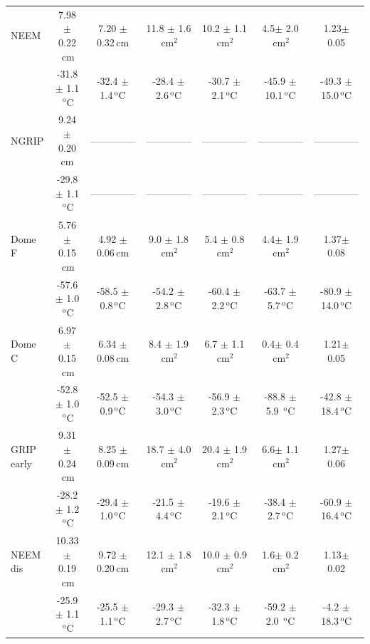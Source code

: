 \documentclass[11pt, draftcls, onecolumn]{IEEEtran} %
\numberwithin{equation}{section}
\numberwithin{table}{section}
\numberwithin{figure}{section}
\begin{document}
\begin{table}[]
\begin{tabular}{l c c c c c c}
		NEEM&7.98 $\pm$ 0.22$\,\mathrm{cm}$& 7.20 $\pm$ 0.32$\,\mathrm{cm}$& 11.8 $\pm$ 1.6$\,\mathrm{cm}^2$& 10.2 $\pm$ 1.1$\,\mathrm{cm}^2$& 4.5$\pm$ 2.0$\,\mathrm{cm}^2$& 1.23$\pm$ 0.05\\
		& -31.8 $\pm$ 1.1$\,^\mathrm{o}$C & -32.4 $\pm$ 1.4$\,^\mathrm{o}$C& -28.4 $\pm$ 2.6$\,^\mathrm{o}$C& -30.7 $\pm$ 2.1$\,^\mathrm{o}$C& -45.9 $\pm$ 10.1$\,^\mathrm{o}$C& -49.3 $\pm$ 15.0$\,^\mathrm{o}$C\\
		
		NGRIP &9.24 $\pm$ 0.20 $\mathrm{cm}$&-------------- &--------------&-------------- & --------------&-------------- \\
		& -29.8 $\pm$ 1.1$\,^\mathrm{o}$C &--------------& --------------& --------------& --------------&--------------\\	
	
		Dome F&5.76 $\pm$ 0.15$\,\mathrm{cm}$& 4.92 $\pm$ 0.06$\,\mathrm{cm}$& 9.0 $\pm$ 1.8$\,\mathrm{cm}^2$& 5.4 $\pm$ 0.8$\,\mathrm{cm}^2$& 4.4$\pm$ 1.9$\,\mathrm{cm}^2$& 1.37$\pm$ 0.08\\
		& -57.6 $\pm$ 1.0$\,^\mathrm{o}$C & -58.5 $\pm$ 0.8$\,^\mathrm{o}$C& -54.2 $\pm$ 2.8$\,^\mathrm{o}$C& -60.4 $\pm$ 2.2$\,^\mathrm{o}$C& -63.7 $\pm$ 5.7$\,^\mathrm{o}$C& -80.9 $\pm$ 14.0$\,^\mathrm{o}$C\\

		Dome C &6.97 $\pm$ 0.15$\,\mathrm{cm}$& 6.34 $\pm$ 0.08$\,\mathrm{cm}$& 8.4 $\pm$ 1.9$\,\mathrm{cm}^2$& 6.7 $\pm$ 1.1$\,\mathrm{cm}^2$& 0.4$\pm$ 0.4$\,\mathrm{cm}^2$& 1.21$\pm$ 0.05\\
		& -52.8 $\pm$ 1.0 $\,^\mathrm{o}$C & -52.5 $\pm$ 0.9$\,^\mathrm{o}$C& -54.3 $\pm$ 3.0$\,^\mathrm{o}$C& -56.9 $\pm$ 2.3$\,^\mathrm{o}$C& -88.8 $\pm$ 5.9 $\,^\mathrm{o}$C& -42.8 $\pm$ 18.4$\,^\mathrm{o}$C\\
	
		GRIP early &9.31 $\pm$ 0.24$\,\mathrm{cm}$& 8.25 $\pm$ 0.09$\,\mathrm{cm}$& 18.7 $\pm$ 4.0$\,\mathrm{cm}^2$& 20.4 $\pm$ 1.9$\,\mathrm{cm}^2$& 6.6$\pm$ 1.1$\,\mathrm{cm}^2$& 1.27$\pm$ 0.06\\
		& -28.2 $\pm$ 1.2$\,^\mathrm{o}$C & -29.4 $\pm$ 1.0$\,^\mathrm{o}$C& -21.5 $\pm$ 4.4$\,^\mathrm{o}$C& -19.6 $\pm$ 2.1$\,^\mathrm{o}$C& -38.4 $\pm$ 2.7$\,^\mathrm{o}$C& -60.9 $\pm$ 16.4$\,^\mathrm{o}$C\\
	
		NEEM dis &10.33 $\pm$ 0.19$\,\mathrm{cm}$& 9.72 $\pm$ 0.20$\,\mathrm{cm}$& 12.1 $\pm$ 1.8$\,\mathrm{cm}^2$& 10.0 $\pm$ 0.9$\,\mathrm{cm}^2$& 1.6$\pm$ 0.2$\,\mathrm{cm}^2$& 1.13$\pm$ 0.02\\
		& -25.9 $\pm$ 1.1$\,^\mathrm{o}$C & -25.5 $\pm$ 1.1$\,^\mathrm{o}$C& -29.3 $\pm$ 2.7$\,^\mathrm{o}$C& -32.3 $\pm$ 1.8$\,^\mathrm{o}$C& -59.2 $\pm$ 2.0 $\,^\mathrm{o}$C& -4.2 $\pm$ 18.3$\,^\mathrm{o}$C\\
	

\end{tabular}
\end{table}
\end{document}
